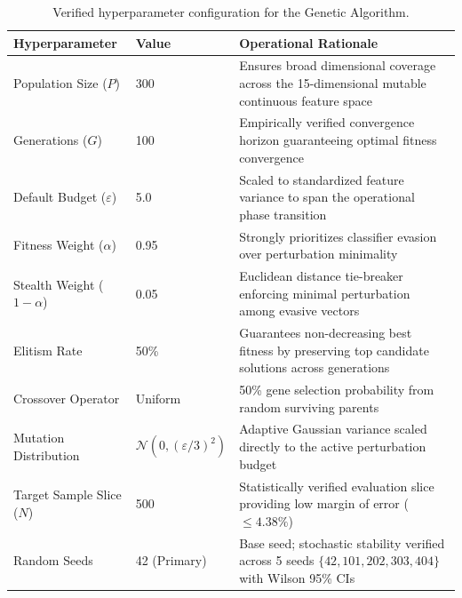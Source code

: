 \documentclass[iicol,pdflatex,sn-mathphys-num]{sn-jnl}
\begin{document}
\begin{table}[t]
\centering
\small
\caption{Verified hyperparameter configuration for the Genetic Algorithm.}
\label{tab:ga_hyperparams}
\begin{tabularx}{\textwidth}{l l X}
\toprule
\textbf{Hyperparameter} & \textbf{Value} & \textbf{Operational Rationale} \\
\midrule
Population Size ($P$) & 300 & Ensures broad dimensional coverage across the 15-dimensional mutable continuous feature space \\
Generations ($G$) & 100 & Empirically verified convergence horizon guaranteeing optimal fitness convergence \\
Default Budget ($\varepsilon$) & 5.0 & Scaled to standardized feature variance to span the operational phase transition \\
Fitness Weight ($\alpha$) & 0.95 & Strongly prioritizes classifier evasion over perturbation minimality \\
Stealth Weight ($1-\alpha$) & 0.05 & Euclidean distance tie-breaker enforcing minimal perturbation among evasive vectors \\
Elitism Rate & 50\% & Guarantees non-decreasing best fitness by preserving top candidate solutions across generations \\
Crossover Operator & Uniform & 50\% gene selection probability from random surviving parents \\
Mutation Distribution & $\mathcal{N}(0, (\varepsilon/3)^2)$ & Adaptive Gaussian variance scaled directly to the active perturbation budget \\
Target Sample Slice ($N$) & 500 & Statistically verified evaluation slice providing low margin of error ($\le 4.38\%$) \\
Random Seeds & 42 (Primary) & Base seed; stochastic stability verified across 5 seeds $\{42, 101, 202, 303, 404\}$ with Wilson 95\% CIs \\
\bottomrule
\end{tabularx}
\end{table}
\end{document}

